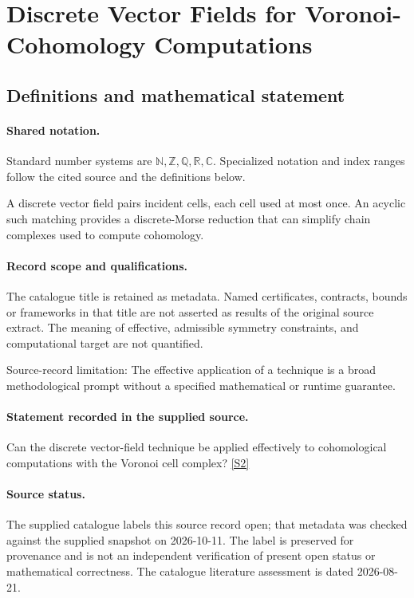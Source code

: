 \documentclass[11pt]{article}
\newcommand{\sref}[2]{\hyperlink{source:#1:#2}{[S#2]}}
\begin{document}
\section{Discrete Vector Fields for Voronoi-Cohomology Computations}\label{statement}

\subsection{Definitions and mathematical statement}

\paragraph{Shared notation.}Standard number systems are $\mathbb N,\mathbb Z,\mathbb Q,\mathbb R,\mathbb C$. Specialized notation and index ranges follow the cited source and the definitions below.


A discrete vector field pairs incident cells, each cell used at most once. An acyclic such matching provides a discrete-Morse reduction that can simplify chain complexes used to compute cohomology.
\paragraph{Record scope and qualifications.}
The catalogue title is retained as metadata. Named certificates, contracts, bounds or frameworks in that title are not asserted as results of the original source extract.
The meaning of effective, admissible symmetry constraints, and computational target are not quantified.

Source-record limitation: The effective application of a technique is a broad methodological prompt without a specified mathematical or runtime guarantee.
\paragraph{Statement recorded in the supplied source.}
Can the discrete vector-field technique be applied effectively to cohomological computations with the Voronoi cell complex? \sref{statement}{2}
\paragraph{Source status.}
The supplied catalogue labels this source record open; that metadata was checked against the supplied snapshot on 2026-10-11. The label is preserved for provenance and is not an independent verification of present open status or mathematical correctness. The catalogue literature assessment is dated 2026-08-21.
\end{document}
